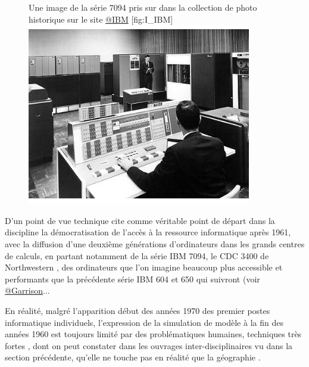 {\begin{figure}[h]
\begin{sidecaption}[fortoc]{Une image de la série 7094 pris sur dans la collection de photo historique sur le site \href{http://www-03.ibm.com/ibm/history/exhibits/mainframe/mainframe_album.html}{@IBM} }[fig:I_IBM]
  \centering
 \includegraphics[width=.8\linewidth]{IBM7094.jpg}
  \end{sidecaption}
\end{figure}

D'un point de vue technique \textcite{Haggett1969} cite comme véritable point de départ dans la discipline la  démocratisation de l'accès à la ressource informatique après 1961, avec la diffusion d'une deuxième générations d'ordinateurs dans les grands centres de calculs, en partant notamment de la série IBM 7094, le CDC 3400 de Northwestern \autocite[3]{Marble1967}, des ordinateurs que l'on imagine beaucoup plus accessible et performants que la précédente série IBM 604 et 650 qui suivront (voir \href{http://www.aag.org/cs/garrison}{@Garrison}...

En réalité, malgré l'apparition début des années 1970 des premier postes informatique individuels, l'expression de la simulation de modèle à la fin des années 1960 est toujours limité par des problématiques humaines, techniques très fortes \autocite{Haggett1969} \autocite[387]{Marble1972}, dont on peut constater dans les ouvrages inter-disciplinaires vu dans la section précédente, qu'elle ne touche pas en réalité que la géographie \autocite{Guetzkow1972}.

}
